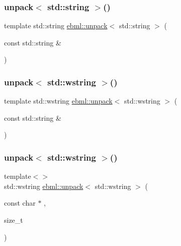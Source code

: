 \mbox{\label{namespaceebml_a59216a04daa34cd404bdd97600ab1fe1}} 
\subsubsection{\texorpdfstring{unpack$<$ std\+::string $>$()}{unpack< std::string >()}\hspace{0.1cm}{\footnotesize\ttfamily [2/2]}}
{\footnotesize\ttfamily template std\+::string \mbox{\hyperlink{namespaceebml_a55a0f9d0c93e80d488021fd03c4f3861}{ebml\+::unpack}}$<$ std\+::string $>$ (\begin{DoxyParamCaption}\item[{const std\+::string \&}]{ }\end{DoxyParamCaption})}

\mbox{\label{namespaceebml_afaec55e41b1bac6c33abe9b8707d489b}} 
\subsubsection{\texorpdfstring{unpack$<$ std\+::wstring $>$()}{unpack< std::wstring >()}\hspace{0.1cm}{\footnotesize\ttfamily [1/2]}}
{\footnotesize\ttfamily template std\+::wstring \mbox{\hyperlink{namespaceebml_a55a0f9d0c93e80d488021fd03c4f3861}{ebml\+::unpack}}$<$ std\+::wstring $>$ (\begin{DoxyParamCaption}\item[{const std\+::string \&}]{ }\end{DoxyParamCaption})}

\mbox{\label{namespaceebml_afe61c84674c5ceeaf4d19fa2f994e37b}} 
\subsubsection{\texorpdfstring{unpack$<$ std\+::wstring $>$()}{unpack< std::wstring >()}\hspace{0.1cm}{\footnotesize\ttfamily [2/2]}}
{\footnotesize\ttfamily template$<$$>$ \\
std\+::wstring \mbox{\hyperlink{namespaceebml_a55a0f9d0c93e80d488021fd03c4f3861}{ebml\+::unpack}}$<$ std\+::wstring $>$ (\begin{DoxyParamCaption}\item[{const char $\ast$}]{,  }\item[{size\+\_\+t}]{ }\end{DoxyParamCaption})}

